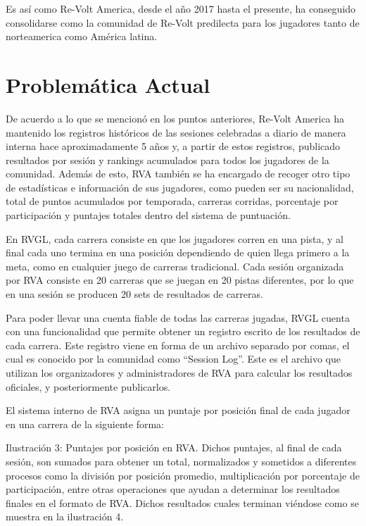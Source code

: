 Es así como Re-Volt America, desde el año 2017 hasta el presente, ha conseguido consolidarse como la comunidad de Re-Volt predilecta para los jugadores tanto de norteamerica como América latina.

\section{Problemática Actual}
De acuerdo a lo que se mencionó en los puntos anteriores, Re-Volt America ha mantenido los registros históricos de las sesiones celebradas a diario de manera interna hace aproximadamente 5 años y, a partir de estos registros, publicado resultados por sesión y rankings acumulados para todos los jugadores de la comunidad. Además de esto, RVA también se ha encargado de recoger otro tipo de estadísticas e información de sus jugadores, como pueden ser su nacionalidad, total de puntos acumulados por temporada, carreras corridas, porcentaje por participación y puntajes totales dentro del sistema de puntuación.

En RVGL, cada carrera consiste en que los jugadores corren en una pista, y al final cada uno termina en una posición dependiendo de quien llega primero a la meta, como en cualquier juego de carreras tradicional. Cada sesión organizada por RVA consiste en 20 carreras que se juegan en 20 pistas diferentes, por lo que en una sesión se producen 20 sets de resultados de carreras.

Para poder llevar una cuenta fiable de todas las carreras jugadas, RVGL cuenta con una funcionalidad que permite obtener un registro escrito de los resultados de cada carrera. Este registro viene en forma de un  archivo separado por comas, el cual es conocido por la comunidad como “Session Log”. Este es el archivo que utilizan los organizadores y administradores de RVA para calcular los resultados oficiales, y posteriormente publicarlos.

El sistema interno de RVA asigna un puntaje por posición final de cada jugador en una carrera de la siguiente forma:

Ilustración 3: Puntajes por posición en RVA.
Dichos puntajes, al final de cada sesión, son sumados para obtener un total, normalizados y sometidos a diferentes procesos como la división por posición promedio, multiplicación por porcentaje de participación, entre otras operaciones que ayudan a determinar los resultados finales en el formato de RVA. Dichos resultados cuales terminan viéndose como se muestra en la ilustración 4.

